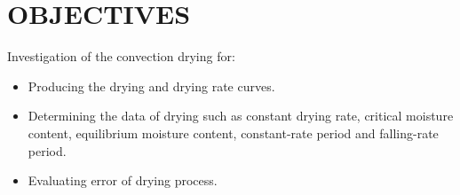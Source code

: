 \section{OBJECTIVES}
Investigation of the convection drying for:
\begin{itemize}
    \item Producing the drying and drying rate curves.
    \item Determining the data of drying such as constant drying rate, critical moisture content, equilibrium moisture content, constant-rate period and falling-rate period.
    \item Evaluating error of drying process.
\end{itemize}
